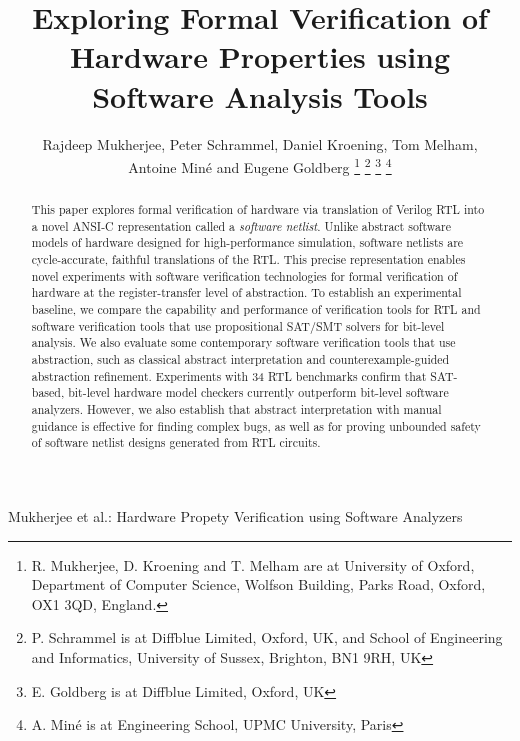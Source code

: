 \documentclass[journal]{IEEEtran}
\theoremstyle{definition}
\begin{document}
\title{Exploring Formal Verification of Hardware Properties using Software Analysis Tools}

\author{Rajdeep Mukherjee, 
        Peter Schrammel,
        Daniel Kroening, 
        Tom Melham, \\
        Antoine Min{\'e} and
        Eugene Goldberg
        \thanks{R. Mukherjee, D. Kroening and T. Melham are at 
                University of Oxford, Department of Computer Science,
                Wolfson Building, Parks Road,
                Oxford, OX1 3QD, England.}
        \thanks{P. Schrammel is at  Diffblue Limited, Oxford, UK, and
                School of Engineering and Informatics,
                University of Sussex, Brighton, BN1 9RH, UK}
        \thanks{E. Goldberg is at Diffblue Limited, Oxford, UK}
        \thanks{A. Min{\'e} is at Engineering School, UPMC University, Paris}}
%
         {Mukherjee et al.: Hardware Propety Verification using Software Analyzers}

\maketitle

\begin{abstract}
This paper explores formal verification of hardware via translation of
Verilog RTL into a novel ANSI-C representation called a \emph{software
netlist}.  Unlike abstract software models of hardware designed for
high-performance simulation, software netlists are cycle-accurate, faithful
translations of the RTL.  This precise representation enables novel
experiments with software verification technologies for formal verification
of hardware at the register-transfer level of abstraction.  To establish an
experimental baseline, we compare the capability and performance of verification
tools for RTL and software verification tools that use propositional SAT/SMT
solvers for bit-level analysis.  We also evaluate some contemporary software
verification tools that use abstraction, such as classical abstract
interpretation and counterexample-guided abstraction refinement.
Experiments with 34 RTL benchmarks confirm that SAT-based, bit-level
hardware model checkers currently outperform bit-level software analyzers.
However, we also establish that abstract interpretation with manual guidance
is effective for finding complex bugs, as well as for proving unbounded safety
of software netlist designs generated from RTL circuits.
\end{abstract}
\end{document}
